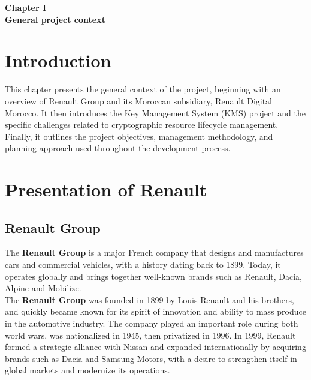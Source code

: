 
\vspace*{9cm}
\begin{doublespace}
    \centering
    \textbf{ \huge Chapter I \\ [1 cm] General project context}
\end{doublespace} 

\newpage
\fancyhead[R]{\rightmark}

\doublespacing

\section*{Introduction}

This chapter presents the general context of the project, beginning with an overview of Renault Group and its Moroccan subsidiary, Renault Digital Morocco. It then introduces the Key Management System (KMS) project and the specific challenges related to cryptographic resource lifecycle management. Finally, it outlines the project objectives, management methodology, and planning approach used throughout the development process.

\section{Presentation of Renault}

\subsection{Renault Group}
The \textbf{Renault Group} is a major French company that designs and manufactures cars and commercial vehicles, with a history dating back to 1899. Today, it operates globally and brings together well-known brands such as Renault, Dacia, Alpine and Mobilize. \\

\noindent
The \textbf{Renault Group} was founded in 1899 by Louis Renault and his brothers, and quickly became known for its spirit of innovation and ability to mass produce in the automotive industry. The company played an important role during both world wars, was nationalized in 1945, then privatized in 1996. In 1999, Renault formed a strategic alliance with Nissan and expanded internationally by acquiring brands such as Dacia and Samsung Motors, with a desire to strengthen itself in global markets and modernize its operations.


